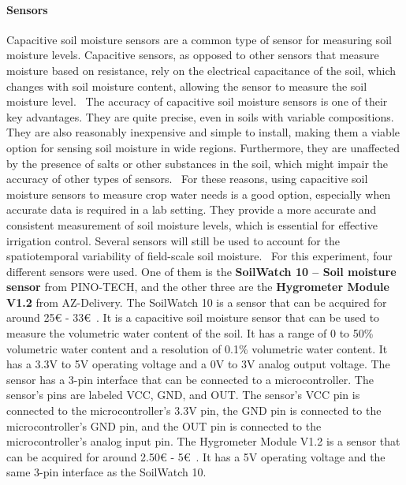 \documentclass[11pt]{scrartcl} %
\begin{document}
\paragraph{Sensors}
\label{sec:sensors}
Capacitive soil moisture sensors are a common type of sensor for measuring soil moisture levels. Capacitive sensors, as opposed to other sensors that measure moisture based on resistance, rely on the electrical capacitance of the soil, which changes with soil moisture content, allowing the sensor to measure the soil moisture level.~\parencite{sensor_types}
\newline The accuracy of capacitive soil moisture sensors is one of their key advantages. They are quite precise, even in soils with variable compositions. They are also reasonably inexpensive and simple to install, making them a viable option for sensing soil moisture in wide regions. Furthermore, they are unaffected by the presence of salts or other substances in the soil, which might impair the accuracy of other types of sensors.~\parencite{sensor_types}
\newline For these reasons, using capacitive soil moisture sensors to measure crop water needs is a good option, especially when accurate data is required in a lab setting. They provide a more accurate and consistent measurement of soil moisture levels, which is essential for effective irrigation control. Several sensors will still be used to account for the spatiotemporal variability of field-scale soil moisture.~\parencite{sensor_types}
\newline For this experiment, four different sensors were used. One of them is the \textbf{SoilWatch 10 – Soil moisture sensor} from PINO-TECH, and the other three are the \textbf{Hygrometer Module V1.2} from AZ-Delivery. 
\newline The SoilWatch 10 is a sensor that can be acquired for around 25€ - 33€~\parencite{pino_tech_soilwatch_10}. It is a capacitive soil moisture sensor that can be used to measure the volumetric water content of the soil. It has a range of 0 to 50\% volumetric water content and a resolution of 0.1\% volumetric water content. It has a 3.3V to 5V operating voltage and a 0V to 3V analog output voltage. The sensor has a 3-pin interface that can be connected to a microcontroller. The sensor's pins are labeled VCC, GND, and OUT. The sensor's VCC pin is connected to the microcontroller's 3.3V pin, the GND pin is connected to the microcontroller's GND pin, and the OUT pin is connected to the microcontroller's analog input pin. 
\newline The Hygrometer Module V1.2 is a sensor that can be acquired for around 2.50€ - 5€~\parencite{az_delivery_hygrometer_module_v1_2}. It has a 5V operating voltage and the same 3-pin interface as the SoilWatch 10.
\end{document}
